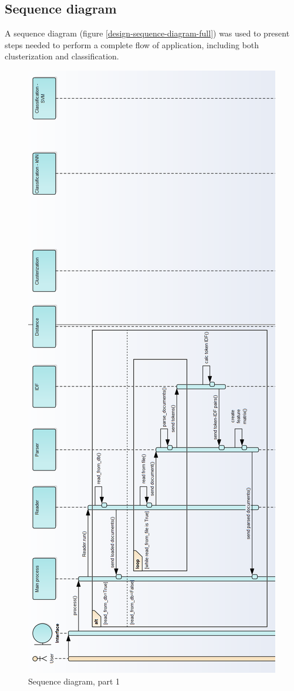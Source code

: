 \subsection{Sequence diagram}
A sequence diagram (figure \ref{design-sequence-diagram-full}) was used to present steps needed to perform a complete flow of application, including both clusterization and classification.

\begin{figure}[H]
	\begin{center}
		\includegraphics[width=0.5\linewidth]{images/diagrams/seq1-h.png}
		\caption{Sequence diagram, part 1}
		\label{design-sequence-diagram-1}
	\end{center}
\end{figure}

